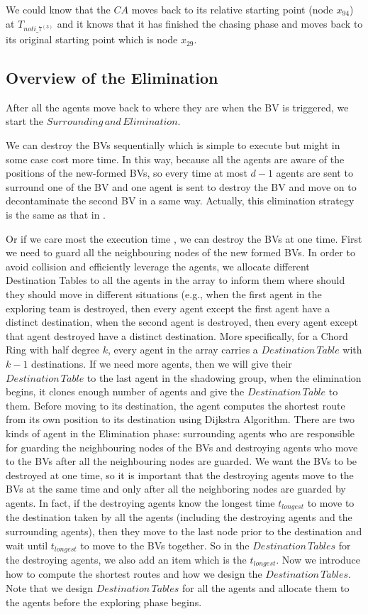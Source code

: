 We could know that the $CA$ moves back to its relative starting point (node $x_{94}$) at $T_{noti\_7^{(3)}}$ and it knows that it has finished the chasing phase and moves back to its original starting point which is node $x_{29}$.


\subsection{Overview of the Elimination}
After all the agents move back to where they are when the BV is triggered, we start the $Surrounding\,and\,Elimination$. 

We can destroy the BVs sequentially which is simple to execute but might in some case cost more time. In this way, because all the agents are aware of the positions of the new-formed BVs, so every time at most $d-1$ agents are sent to surround one of the BV and one agent is sent to destroy the BV and move on to decontaminate the second BV in a same way. Actually, this elimination strategy is the same as that in \cite{Alotaibi}. 

Or if we care most the execution time , we can destroy the BVs at one time. First we need to guard all the neighbouring nodes of the new formed BVs. In order to avoid collision and efficiently leverage the agents, we allocate different Destination Tables to all the agents in the array to inform them where should they should move in different situations (e.g., when the first agent in the exploring team is destroyed, then every agent except the first agent have a distinct destination, when the second agent is destroyed, then every agent except that agent destroyed have a distinct destination. More specifically, for a Chord Ring with half degree $k$, every agent in the array carries a $Destination\,Table$ with $k-1$ destinations. If we need more agents, then we will give their $Destination\,Table$ to the last agent in the shadowing group, when the elimination begins, it clones enough number of agents and give the $Destination\, Table$ to them. Before moving to its destination, the agent computes the shortest route from its own position to its destination using Dijkstra Algorithm. There are two kinds of agent in the Elimination phase: surrounding agents who are responsible for guarding the neighbouring nodes of the BVs and destroying agents who move to the BVs after all the neighbouring nodes are guarded. We want the BVs to be destroyed at one time, so it is important that the destroying agents move to the BVs at the same time and only after all the neighboring nodes are guarded by agents. In fact, if the destroying agents know the longest time $t_{longest}$ to move to the destination taken by all the agents (including the destroying agents and the surrounding agents), then they move to the last node prior to the destination and wait until $t_{longest}$ to move to the BVs together. So in the $Destination\,Tables$ for the destroying agents, we also add an item which is the $t_{longest}$. Now we introduce how to compute the shortest routes and how we design the $Destination\,Tables$. Note that we design $Destination\,Tables$ for all the agents and allocate them to the agents before the exploring phase begins.

